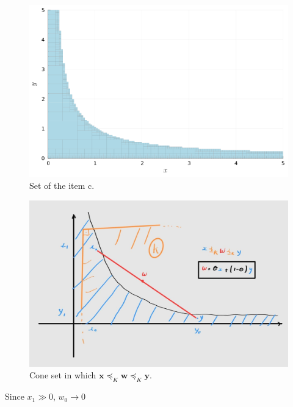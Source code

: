 \documentclass[12pt,a4paper]{article}
\begin{document}
\begin{figure}[H]
    \centering
    \includegraphics[scale=0.4]{figs/2.8c.png}
    \caption{Set of the item c.}
    \label{fig:2.8c}
\end{figure}

\begin{figure}[H]
    \centering
    \includegraphics[scale=0.2]{figs/2.8_set.png}
    \caption{Cone set in which \(\mathbf{x} \preceq_K \mathbf{w} \preceq_K \mathbf{y}\).}
    \label{fig:2.8c-set}
\end{figure}


Since \(x_1 \gg 0\), \(w_0 \rightarrow 0\)

\end{document}
